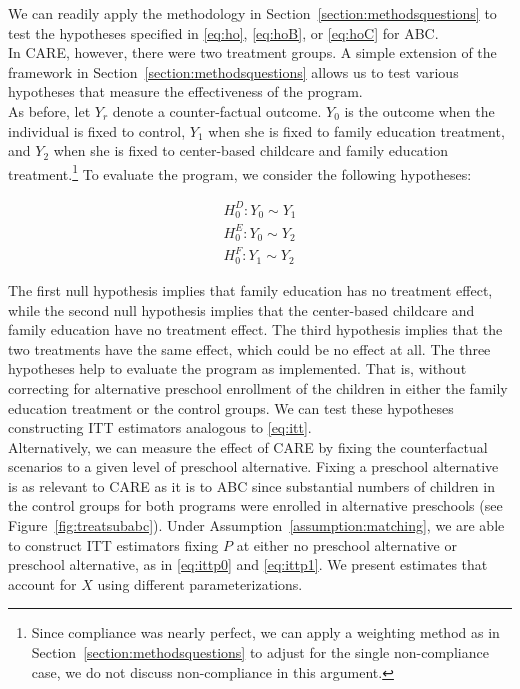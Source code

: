 \noindent We can readily apply the methodology in Section~\ref{section:methodsquestions} to test the hypotheses specified in \eqref{eq:ho}, \eqref{eq:hoB}, or \eqref{eq:hoC} for ABC.\\

\noindent In CARE, however, there were two treatment groups. A simple extension of the framework in Section~\ref{section:methodsquestions} allows us to test various hypotheses that measure the effectiveness of the program.\\

\noindent As before, let $Y_{r}$ denote a counter-factual outcome. $Y_{0}$ is the outcome when the individual is fixed to control, $Y_{1}$ when she is fixed to family education treatment, and $Y_{2}$ when she is fixed to center-based childcare and family education treatment.\footnote{Since compliance was nearly perfect, we can apply a weighting method as in Section~\ref{section:methodsquestions} to adjust for the single non-compliance case, we do not discuss non-compliance in this argument.} To evaluate the program, we consider the following hypotheses: 

\begin{eqnarray}
H_{0}^D: Y_{0} \sim Y_{1} \\ 
H_{0}^E: Y_{0} \sim Y_{2} \\
H_{0}^F: Y_{1} \sim Y_{2} 
\end{eqnarray}

\noindent The first null hypothesis implies that family education has no treatment effect, while the second null hypothesis implies that the center-based childcare and family education have no treatment effect. The third hypothesis implies that the two treatments have the same effect, which could be no effect at all. The three hypotheses help to evaluate the program as implemented. That is, without correcting for alternative preschool enrollment of the children in either the family education treatment or the control groups. We can test these hypotheses constructing ITT estimators analogous to \eqref{eq:itt}.\\ 

\noindent Alternatively, we can measure the effect of CARE by fixing the counterfactual scenarios to a given level of preschool alternative. Fixing a preschool alternative is as relevant to CARE as it is to ABC since substantial numbers of children in the control groups for both programs were enrolled in alternative preschools (see Figure~\ref{fig:treatsubabc}). Under Assumption~\ref{assumption:matching}, we are able to construct ITT estimators fixing $P$ at either no preschool alternative or preschool alternative, as in \eqref{eq:ittp0} and \eqref{eq:ittp1}. We present estimates that account for $X$ using different parameterizations.\\

